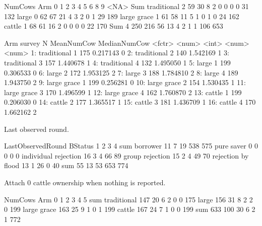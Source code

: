 \begin{Schunk}
\begin{Soutput}
             NumCows
Arm             0   1   2   3   4   5   6   8   9 <NA> Sum
  traditional   2  59  30   8   2   0   0   0   0   31 132
  large         0  62  67  21   4   3   2   0   1   29 189
  large grace   1  61  58  11   5   1   0   1   0   24 162
  cattle        1  68  61  16   2   0   0   0   0   22 170
  Sum           4 250 216  56  13   4   2   1   1  106 653
\end{Soutput}
\begin{Soutput}
            Arm survey     N MeanNumCow MedianNumCow
         <fctr>  <num> <int>      <num>        <num>
 1: traditional      1   175   0.217143            0
 2: traditional      2   140   1.542169            1
 3: traditional      3   157   1.440678            1
 4: traditional      4   132   1.495050            1
 5:       large      1   199   0.306533            0
 6:       large      2   172   1.953125            2
 7:       large      3   188   1.784810            2
 8:       large      4   189   1.943750            2
 9: large grace      1   199   0.256281            0
10: large grace      2   154   1.530435            1
11: large grace      3   170   1.496599            1
12: large grace      4   162   1.760870            2
13:      cattle      1   199   0.206030            0
14:      cattle      2   177   1.365517            1
15:      cattle      3   181   1.436709            1
16:      cattle      4   170   1.662162            2
\end{Soutput}
\end{Schunk}
Last observed round.
\begin{Schunk}
\begin{Soutput}
                      LastObservedRound
BStatus                  1   2   3   4 sum
  borrower              11   7  19 538 575
  pure saver             0   0   0   0   0
  individual rejection  16   3   4  66  89
  group rejection       15   2   4  49  70
  rejection by flood    13   1  26   0  40
  sum                   55  13  53 653 774
\end{Soutput}
\end{Schunk}
Attach 0 cattle ownership when nothing is reported.
\begin{Schunk}
\begin{Soutput}
             NumCows
Arm             0   1   2   3   4   5 sum
  traditional 147  20   6   2   0   0 175
  large       156  31   8   2   2   0 199
  large grace 163  25   9   1   0   1 199
  cattle      167  24   7   1   0   0 199
  sum         633 100  30   6   2   1 772
\end{Soutput}
\end{Schunk}
